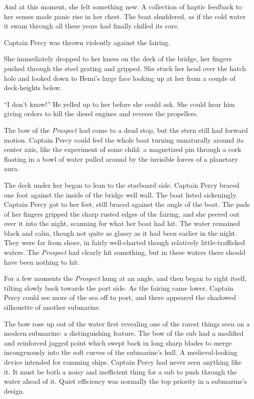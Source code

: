 \documentclass[]{article}
\begin{document}
\begin{multicols}{2}
And at this moment, she felt something new. A collection of haptic
feedback to her senses made panic rise in her chest. The boat shuddered,
as if the cold water it swam through all these years had finally chilled
its core.

Captain Percy was thrown violently against the fairing.

She immediately dropped to her knees on the deck of the bridge, her
fingers pushed through the steel grating and gripped. She stuck her head
over the hatch hole and looked down to Hemi's large face looking up at
her from a couple of deck-heights below.

``I don't know!'' He yelled up to her before she could ask. She could
hear him giving orders to kill the diesel engines and reverse the
propellers.

The bow of the \emph{Prospect} had come to a dead stop, but the stern
still had forward motion. Captain Percy could feel the whole boat
turning unnaturally around its center axis, like the experiment of some
child: a magnetized pin through a cork floating in a bowl of water
pulled around by the invisible forces of a planetary aura.

The deck under her began to lean to the starboard side. Captain Percy
braced one foot against the inside of the bridge well wall. The boat
listed sickeningly. Captain Percy got to her feet, still braced against
the angle of the boat. The pads of her fingers gripped the sharp rusted
edges of the fairing, and she peered out over it into the night,
scanning for what her boat had hit. The water remained black and calm,
though not quite as glassy as it had been earlier in the night. They
were far from shore, in fairly well-charted though relatively
little-trafficked waters. The \emph{Prospect} had clearly hit something,
but in these waters there should have been nothing to hit.

For a few moments the \emph{Prospect} hung at an angle, and then began
to right itself, tilting slowly back towards the port side. As the
fairing came lower, Captain Percy could see more of the sea off to port,
and there appeared the shadowed silhouette of another submarine.

The bow rose up out of the water first revealing one of the rarest
things seen on a modern submarine: a distinguishing feature. The bow of
the sub had a modified and reinforced jagged point which swept back in
long sharp blades to merge incongruously into the soft curves of the
submarine's hull. A medieval-looking device intended for ramming ships.
Captain Percy had never seen anything like it. It must be both a noisy
and inefficient thing for a sub to push through the water ahead of it.
Quiet efficiency was normally the top priority in a submarine's design.


\end{multicols}
\end{document}
